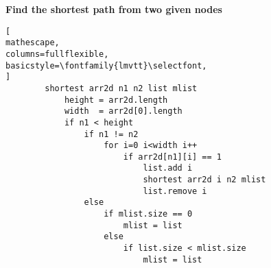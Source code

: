 \documentclass{article}
\begin{document}
\textbf{Find the shortest path from two given nodes}
\begin{lstlisting}[
mathescape,
columns=fullflexible,
basicstyle=\fontfamily{lmvtt}\selectfont,
]
        shortest arr2d n1 n2 list mlist
            height = arr2d.length
            width  = arr2d[0].length
            if n1 < height
                if n1 != n2
                    for i=0 i<width i++
                        if arr2d[n1][i] == 1
                            list.add i
                            shortest arr2d i n2 mlist
                            list.remove i
                else
                    if mlist.size == 0
                        mlist = list
                    else
                        if list.size < mlist.size
                            mlist = list

\end{lstlisting} 
\end{document}

